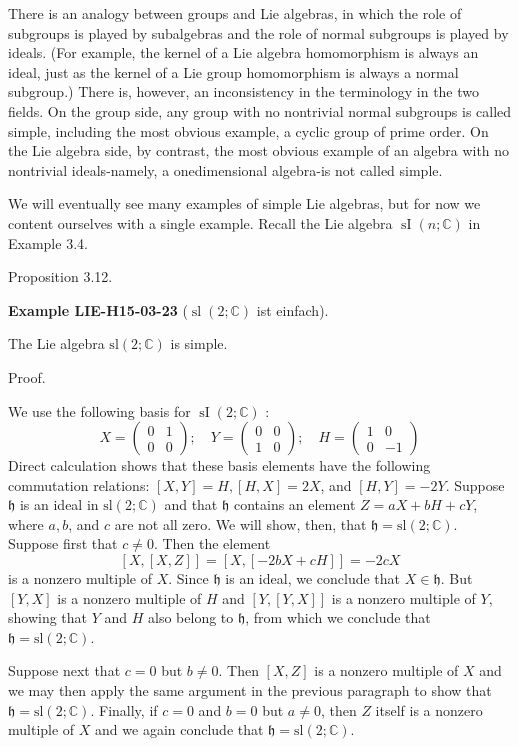\documentclass[10pt, letterpaper]{article}
\newcommand{\C}{\mathbb{C}}
\newcommand{\CustomHeading}[3]{%
  \par\medskip\noindent%
  \textbf{#1 #2} \textnormal{(#3)}.\enskip%
}
\newenvironment{EXA}[2]{\begin{unitbox}\CustomHeading{Example}{#1}{#2}}{\end{unitbox}}
\begin{document}
There is an analogy between groups and Lie algebras, in which the role of subgroups is played by subalgebras and the role of normal subgroups is played by ideals. (For example, the kernel of a Lie algebra homomorphism is always an ideal, just as the kernel of a Lie group homomorphism is always a normal subgroup.) There is, however, an inconsistency in the terminology in the two fields. On the group side, any group with no nontrivial normal subgroups is called simple, including the most obvious example, a cyclic group of prime order. On the Lie algebra side, by contrast, the most obvious example of an algebra with no nontrivial ideals-namely, a onedimensional algebra-is not called simple.

We will eventually see many examples of simple Lie algebras, but for now we content ourselves with a single example. Recall the Lie algebra $\operatorname{sI}(n ; \mathbb{C})$ in Example 3.4.

Proposition 3.12. 


\begin{EXA}{LIE-H15-03-23}{$\operatorname{sl}(2;\C)$ ist einfach}
The Lie algebra $\mathrm{sl}(2 ; \mathbb{C})$ is simple.

Proof. 

We use the following basis for $\operatorname{sI}(2 ; \mathbb{C})$ :
$$
X=\left(\begin{array}{ll}
0 & 1 \\
0 & 0
\end{array}\right) ; \quad Y=\left(\begin{array}{ll}
0 & 0 \\
1 & 0
\end{array}\right) ; \quad H=\left(\begin{array}{rr}
1 & 0 \\
0 & -1
\end{array}\right)
$$
Direct calculation shows that these basis elements have the following commutation relations: $[X, Y]=H,[H, X]=2 X$, and $[H, Y]=-2 Y$. Suppose $\mathfrak{h}$ is an ideal in $\mathrm{sl}(2 ; \mathbb{C})$ and that $\mathfrak{h}$ contains an element $Z=a X+b H+c Y$, where $a, b$, and $c$ are not all zero. We will show, then, that $\mathfrak{h}=\mathrm{sl}(2 ; \mathbb{C})$. Suppose first that $c \neq 0$. Then the element
$$
[X,[X, Z]]=[X,[-2 b X+c H]]=-2 c X
$$
is a nonzero multiple of $X$. Since $\mathfrak{h}$ is an ideal, we conclude that $X \in \mathfrak{h}$. But $[Y, X]$ is a nonzero multiple of $H$ and $[Y,[Y, X]]$ is a nonzero multiple of $Y$, showing that $Y$ and $H$ also belong to $\mathfrak{h}$, from which we conclude that $\mathfrak{h}=\mathrm{sl}(2 ; \mathbb{C})$.

Suppose next that $c=0$ but $b \neq 0$. Then $[X, Z]$ is a nonzero multiple of $X$ and we may then apply the same argument in the previous paragraph to show that $\mathfrak{h}=\mathrm{sl}(2 ; \mathbb{C})$. Finally, if $c=0$ and $b=0$ but $a \neq 0$, then $Z$ itself is a nonzero multiple of $X$ and we again conclude that $\mathfrak{h}=\mathrm{sl}(2 ; \mathbb{C})$.
\end{EXA}
\end{document}
